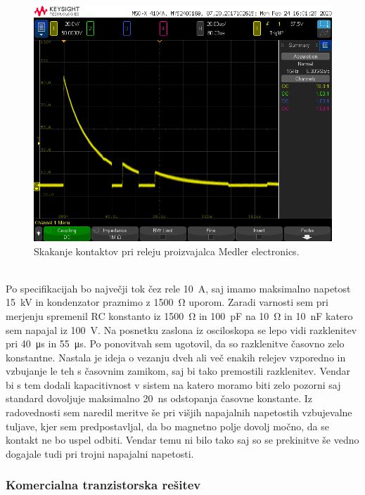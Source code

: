 \documentclass[a4paper,twoside,openright,12pt,Slovene]{book}
\begin{document}
    \begin{figure}[H]
        \centering
        \includegraphics[width=1\columnwidth]{Slike/MedlerElectronicsRele.png}
        \caption{\label{BlokDiagramShema} Skakanje kontaktov pri releju proizvajalca Medler electronics.}
    \end{figure}
    
    ~\\Po specifikacijah bo največji tok čez rele \SI{10}{\ampere}, saj imamo maksimalno napetost \SI{15}{\kilo\volt} in kondenzator praznimo z \SI{1500}{\ohm} uporom. Zaradi varnosti sem pri merjenju spremenil RC konstanto iz \SI{1500}{\ohm} in \SI{100}{\pico\farad} na \SI{10}{\ohm} in \SI{10}{\nano\farad} katero sem napajal iz \SI{100}{\volt}. Na posnetku zaslona iz osciloskopa se lepo vidi razklenitev pri \SI{40}{\micro\second} in \SI{55}{\micro\second}. Po ponovitvah sem ugotovil, da so razklenitve časovno zelo konstantne. Nastala je ideja o vezanju dveh ali več enakih relejev vzporedno in vzbujanje le teh s časovnim zamikom, saj bi tako premostili razklenitev. Vendar bi s tem dodali kapacitivnost v sistem na katero moramo biti zelo pozorni saj standard dovoljuje maksimalno \SI{20}{\nano\second} odstopanja časovne konstante.
    Iz radovednosti sem naredil meritve še pri višjih napajalnih napetostih vzbujevalne tuljave, kjer sem predpostavljal, da bo magnetno polje dovolj močno, da se kontakt ne bo uspel odbiti. Vendar temu ni bilo tako saj so se prekinitve še vedno dogajale tudi pri trojni napajalni napetosti.
   
	\subsubsection{Komercialna tranzistorska rešitev} \label{Komercialna tranzistorska rešitev}   
    
\end{document}
